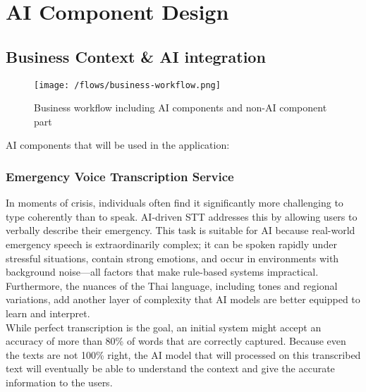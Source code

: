 \chapter{AI Component Design}
\label{chap:ai-component-design}

\section{Business Context \& AI integration}
\label{sec:business_context_ai_integration}
\begin{figure}[h]
    \centering
    \texttt{[image: /flows/business-workflow.png]}
    \caption{Business workflow including AI components and non-AI component part}
\end{figure}
\medskip

AI components that will be used in the application:

\subsection{Emergency Voice Transcription Service}
\label{subsec:ai_comp_transcription_service}
In moments of crisis, individuals often find it significantly more challenging to type coherently than to speak. AI-driven STT addresses this by allowing users to verbally describe their emergency. This task is suitable for AI because real-world emergency speech is extraordinarily complex; it can be spoken rapidly under stressful situations, contain strong emotions, and occur in environments with background noise—all factors that make rule-based systems impractical.\\
\indent Furthermore, the nuances of the Thai language, including tones and regional variations, add another layer of complexity that AI models are better equipped to learn and interpret.\\
\indent While perfect transcription is the goal, an initial system might accept an accuracy of more than 80\% of words that are correctly captured. Because even the texts are not 100\% right, the AI model that will processed on this transcribed text will eventually be able to understand the context and give the accurate information to the users.

